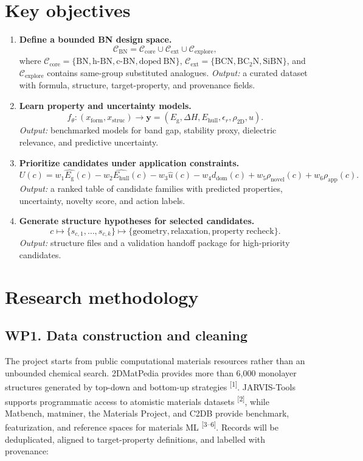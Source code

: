 \documentclass[10pt]{article}
\newcommand{\eg}{E_{\mathrm{g}}}
\newcommand{\ehull}{E_{\mathrm{hull}}}
\newcommand{\form}{x_{\mathrm{form}}}
\newcommand{\struc}{x_{\mathrm{struc}}}
\newcommand{\unc}{u}
\newcommand{\domain}{d_{\mathrm{dom}}}
\newcommand{\utility}{U}
\begin{document}
\section*{Key objectives}
\begin{enumerate}
  \item \textbf{Define a bounded BN design space.}
  \[
    \mathcal{C}_{\mathrm{BN}}=
    \mathcal{C}_{\mathrm{core}}\cup\mathcal{C}_{\mathrm{ext}}\cup
    \mathcal{C}_{\mathrm{explore}},
  \]
  where $\mathcal{C}_{\mathrm{core}}=\{\mathrm{BN},\mathrm{h\mbox{-}BN},
  \mathrm{c\mbox{-}BN},\mathrm{doped\ BN}\}$,
  $\mathcal{C}_{\mathrm{ext}}=\{\mathrm{BCN},\mathrm{BC_2N},\mathrm{SiBN}\}$,
  and $\mathcal{C}_{\mathrm{explore}}$ contains same-group substituted analogues.
  \textit{Output:} a curated dataset with formula, structure, target-property,
  and provenance fields.

  \item \textbf{Learn property and uncertainty models.}
  \[
    f_{\theta}:(\form,\struc)\rightarrow
    \mathbf{y}=(\eg,\Delta H,\ehull,\epsilon_r,\rho_{\mathrm{2D}},\unc).
  \]
  \textit{Output:} benchmarked models for band gap, stability proxy, dielectric
  relevance, and predictive uncertainty.

  \item \textbf{Prioritize candidates under application constraints.}
  \[
    \utility(c)=w_1\hat{\eg}(c)-w_2\hat{\ehull}(c)-w_3\hat{\unc}(c)
    -w_4\domain(c)+w_5\rho_{\mathrm{novel}}(c)+w_6\rho_{\mathrm{app}}(c).
  \]
  \textit{Output:} a ranked table of candidate families with predicted
  properties, uncertainty, novelty score, and action labels.

  \item \textbf{Generate structure hypotheses for selected candidates.}
  \[
    c \mapsto \{s_{c,1},\ldots,s_{c,k}\}
    \mapsto \{\mathrm{geometry},\mathrm{relaxation},\mathrm{property\;recheck}\}.
  \]
  \textit{Output:} structure files and a validation handoff package for
  high-priority candidates.
\end{enumerate}

\section*{Research methodology}
\subsection*{WP1. Data construction and cleaning}
The project starts from public computational materials resources rather than an unbounded chemical search. 2DMatPedia provides more than 6,000 monolayer structures generated by top-down and bottom-up strategies \textsuperscript{[1]}. JARVIS-Tools supports programmatic access to atomistic materials datasets \textsuperscript{[2]}, while Matbench, matminer, the Materials Project, and C2DB provide benchmark, featurization, and reference spaces for materials ML \textsuperscript{[3--6]}. Records will be deduplicated, aligned to target-property definitions, and labelled with provenance:
\end{document}
